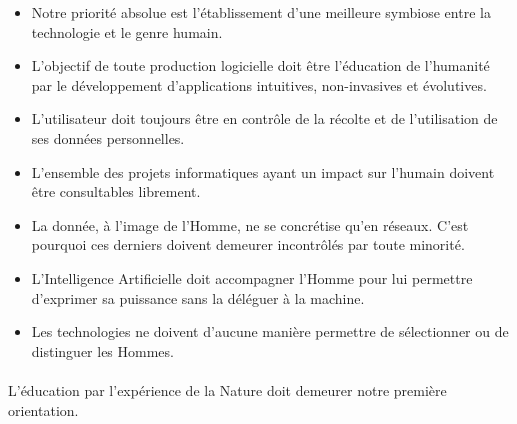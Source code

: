 \begin{itemize}
    \item Notre priorité absolue est l'établissement d'une
    meilleure symbiose entre la technologie et le genre humain.

    \item L'objectif de toute production logicielle doit être
    l'éducation de l'humanité par le développement
    d'applications intuitives, non-invasives et évolutives.

    \item L'utilisateur doit toujours être en contrôle de la
    récolte et de l'utilisation de ses données personnelles.

    \item L'ensemble des projets informatiques ayant un impact
    sur l'humain doivent être consultables librement.

    \item La donnée, à l'image de l'Homme, ne se concrétise qu'en
    réseaux. C'est pourquoi ces derniers doivent demeurer incontrôlés 
    par toute minorité.

    \item L'Intelligence Artificielle doit accompagner l'Homme pour
    lui permettre d'exprimer sa puissance sans la déléguer
    à la machine.

    \item Les technologies ne doivent d'aucune manière permettre de 
    sélectionner ou de distinguer les Hommes.
\end{itemize}

\paragraph{} L'éducation par l'expérience de la Nature doit
demeurer notre première orientation.
